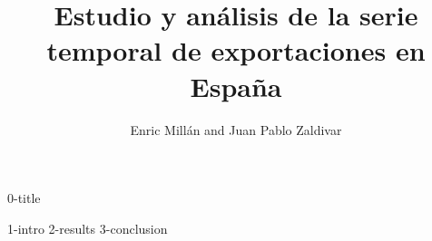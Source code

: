 \documentclass{article}
\title{Estudio y análisis de la serie temporal de exportaciones en España}
\author{Enric Millán and Juan Pablo Zaldivar}
\begin{document}
{0-title}
\newpage

\tableofcontents
\newpage

\fancyfoot{} %
\begin{multicols}{2}
{1-intro}
{2-results}
{3-conclusion}
\end{multicols}
\newpage

\end{document}
